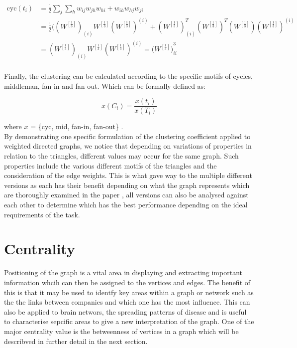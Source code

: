 \begin{align} \label{eq:cyca}
\text{cyc}(t_i) &= \frac{1}{2}\sum_j\sum_h{w_{ij}w_{jh}w_{hi} + w_{ih}w_{hj}w_{ji}} \\
&= \frac{1}{2}((W^{[\frac{1}{3}]})_{(i)}W^{[\frac{1}{3}]}(W^{[\frac{1}{3}]})^{(i)} + (W^{[\frac{1}{3}]})_{(i)}^T(W^{[\frac{1}{3}]})^T(W^{[\frac{1}{3}]})(W^{[\frac{1}{3}]})^{(i)}  \nonumber \\
&= (W^{[\frac{1}{3}]})_{(i)}W^{[\frac{1}{3}]}(W^{[\frac{1}{3}]})^{(i)} = ({W^{[\frac{1}{3}]})}^3_{ii} \nonumber \\ 
\end{align}

Finally, the clustering can be calculated according to the specific motifs of cycles, middleman, fan-in and fan out. Which can be formally defined as:

\begin{equation} \label{eq:wdmcc}
x(C_i) = \frac{x(t_i)}{x(T_i)}
\end{equation}

where $x$ = \{cyc, mid, fan-in, fan-out\} .\\

By demonstrating one specific formulation of the clustering coefficient applied to weighted directed graphs, we notice that depending on variations of properties in relation to the triangles, different values may occur for the same graph. Such properties include the various different motifs of the triangles and the consideration of the edge weights. This is what gave way to the multiple different versions as each has their benefit depending on what the graph represents which are thoroughly examined in the paper \cite{PhysRevResearch.3.043124}, all versions can also be analysed against each other to determine which has the best performance depending on the ideal requirements of the task\cite{CLEMENTE201826}.

\section{Centrality}
Positioning of the graph is a vital area in displaying and extracting important information whcih can then be assigned to the vertices and edges. The benefit of this is that it may be used to identfy key areas within a graph or network such as the the links between companies and which one has the most influence. This can also be applied to brain networs, the spreading patterns of disease and is useful to characterise sepcific areas to give a new interpretation of the graph. One of the major centrality value is the betweenness of vertices in a graph which will be describved in further detail in the next section.

